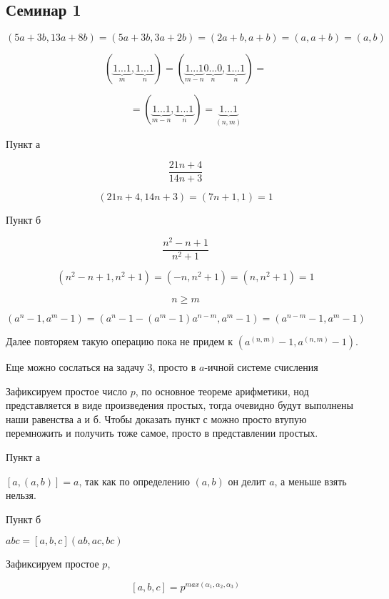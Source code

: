 \subsection{Семинар 1}



$$(5a + 3b, 13a + 8b) = (5a + 3b, 3a + 2b) = (2a + b, a + b) = (a, a + b) = (a, b)$$


$$(\underbrace{1...1}_{m}, \underbrace{1...1}_{n}) = (\underbrace{1...1}_{m - n} \underbrace{0...0}_{n}, \underbrace{1...1}_{n}) =$$

$$= (\underbrace{1...1}_{m - n}, \underbrace{1...1}_{n}) = \underbrace{1...1}_{(n, m)}$$


Пункт а

$$\frac{21n + 4}{14n + 3}$$

$$(21n + 4, 14n + 3) = (7n + 1, 1) = 1$$

Пункт б

$$\frac{n^2 - n + 1}{n^2 + 1}$$

$$(n^2 - n + 1, n^2 + 1) = (-n, n^2 + 1) = (n, n^2 + 1) = 1$$


$$n \geq m$$

$$(a^n - 1, a^m - 1) = (a^n - 1 - (a^m - 1)a^{n - m}, a^m - 1) = (a^{n - m} - 1, a^m - 1)$$

Далее повторяем такую операцию пока не придем к $(a^{(n, m)} - 1, a^{(n, m)} - 1)$.

Еще можно сослаться на задачу 3, просто в $a$-ичной системе счисления


Зафиксируем простое число $p$, по основное теореме арифметики, нод представляется в виде произведения простых, тогда очевидно будут выполнены
наши равенства а и б. Чтобы доказать пункт с можно просто втупую перемножить и получить тоже самое, просто в представлении простых.


Пункт а

$[a, (a, b)] = a$, так как по определению $(a, b)$ он делит $a$, а меньше взять нельзя.

Пункт б

$abc = [a, b, c](ab, ac, bc)$

Зафиксируем простое $p$,

$$[a, b, c] = p^{max(\alpha_1, \alpha_2, \alpha_3)}$$

